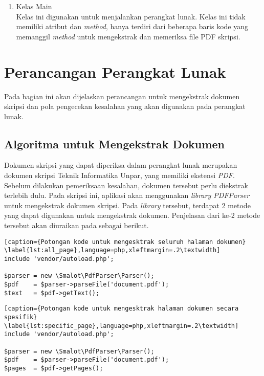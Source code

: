 \begin{enumerate}
\begin{itemize}
		\end{itemize}
	
	\item Kelas Main \\
	Kelas ini digunakan untuk menjalankan perangkat lunak. Kelas ini tidak memiliki atribut dan \textit{method}, hanya terdiri dari beberapa baris kode yang memanggil \textit{method} untuk mengekstrak dan memeriksa file PDF skripsi. 

\end{enumerate} 

\section{Perancangan Perangkat Lunak}
Pada bagian ini akan dijelaskan perancangan untuk mengekstrak dokumen skripsi dan pola pengecekan kesalahan yang akan digunakan pada perangkat lunak.
 
\subsection{Algoritma untuk Mengekstrak Dokumen}
Dokumen skripsi yang dapat diperiksa dalam perangkat lunak merupakan dokumen skripsi Teknik Informatika Unpar, yang memiliki ekstensi \textit{PDF}. Sebelum dilakukan pemeriksaan kesalahan, dokumen tersebut perlu diekstrak terlebih dulu. Pada skripsi ini, aplikasi akan menggunakan \textit{library PDFParser} untuk mengekstrak dokumen skripsi. Pada \textit{library} tersebut, terdapat 2 metode yang dapat digunakan untuk mengekstrak dokumen. Penjelasan dari ke-2 metode tersebut akan diuraikan pada sebagai berikut.
	
\begin{lstlisting}[caption={Potongan kode untuk mengesktrak seluruh halaman dokumen}	\label{lst:all_page},language=php,xleftmargin=.2\textwidth] 
include 'vendor/autoload.php';
	
$parser = new \Smalot\PdfParser\Parser();
$pdf    = $parser->parseFile('document.pdf');
$text   = $pdf->getText();
\end{lstlisting}
	
\begin{lstlisting}[caption={Potongan kode untuk mengesktrak halaman dokumen secara spesifik}
\label{lst:specific_page},language=php,xleftmargin=.2\textwidth] 
include 'vendor/autoload.php';

$parser = new \Smalot\PdfParser\Parser();
$pdf    = $parser->parseFile('document.pdf');
$pages  = $pdf->getPages();
\end{lstlisting}
\medskip

